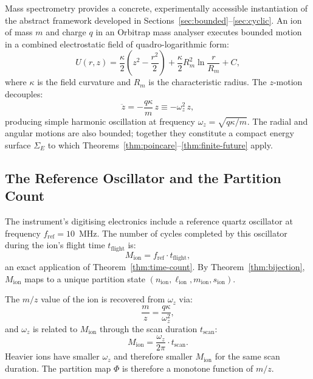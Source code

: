 \documentclass[twocolumn,10pt,a4paper]{article}
\theoremstyle{thmstyle}
\theoremstyle{definition}
\theoremstyle{remark}
\newcommand{\PhiMap}{\varPhi}
\begin{document}
Mass spectrometry provides a concrete, experimentally accessible instantiation of the abstract framework developed in Sections~\ref{sec:bounded}--\ref{sec:cyclic}. An ion of mass $m$ and charge $q$ in an Orbitrap mass analyser \citep{makarov2000} executes bounded motion in a combined electrostatic field of quadro-logarithmic form:
\begin{equation}
    U(r,z) = \frac{\kappa}{2}\left(z^2 - \frac{r^2}{2}\right) + \frac{\kappa}{2}R_m^2\ln\!\frac{r}{R_m} + C,
\end{equation}
where $\kappa$ is the field curvature and $R_m$ is the characteristic radius. The $z$-motion decouples:
\begin{equation}
    \ddot{z} = -\frac{q\kappa}{m}\,z \equiv -\omega_z^2\, z,
\end{equation}
producing simple harmonic oscillation at frequency $\omega_z = \sqrt{q\kappa/m}$. The radial and angular motions are also bounded; together they constitute a compact energy surface $\Sigma_E$ to which Theorems~\ref{thm:poincare}--\ref{thm:finite-future} apply.

\subsection{The Reference Oscillator and the Partition Count}

The instrument's digitising electronics include a reference quartz oscillator at frequency $f_{\mathrm{ref}} = 10$~MHz. The number of cycles completed by this oscillator during the ion's flight time $t_{\mathrm{flight}}$ is:
\begin{equation}
    M_{\mathrm{ion}} = f_{\mathrm{ref}} \cdot t_{\mathrm{flight}},
\end{equation}
an exact application of Theorem~\ref{thm:time-count}. By Theorem~\ref{thm:bijection}, $M_{\mathrm{ion}}$ maps to a unique partition state $(n_{\mathrm{ion}}, \ell_{\mathrm{ion}}, m_{\mathrm{ion}}, s_{\mathrm{ion}})$.

The $m/z$ value of the ion is recovered from $\omega_z$ via:
\begin{equation}
    \frac{m}{z} = \frac{q\kappa}{\omega_z^2},
\end{equation}
and $\omega_z$ is related to $M_{\mathrm{ion}}$ through the scan duration $t_{\mathrm{scan}}$:
\begin{equation}
    M_{\mathrm{ion}} = \frac{\omega_z}{2\pi}\cdot t_{\mathrm{scan}}.
\end{equation}
Heavier ions have smaller $\omega_z$ and therefore smaller $M_{\mathrm{ion}}$ for the same scan duration. The partition map $\PhiMap$ is therefore a monotone function of $m/z$.
\end{document}
